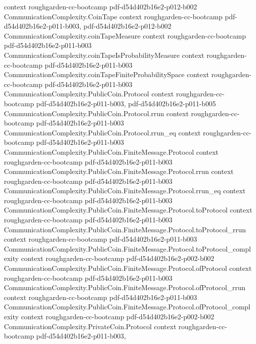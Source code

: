 \begin{theorem}
  {context}
  {roughgarden-cc-bootcamp}
  {pdf-d54d402b16e2-p012-b002}
\proofstep
  {CommunicationComplexity.CoinTape}
  {context}
  {roughgarden-cc-bootcamp}
  {pdf-d54d402b16e2-p011-b003,
    pdf-d54d402b16e2-p012-b002}
\proofstep
  {CommunicationComplexity.coinTapeMeasure}
  {context}
  {roughgarden-cc-bootcamp}
  {pdf-d54d402b16e2-p011-b003}
\proofstep
  {CommunicationComplexity.coinTapeIsProbabilityMeasure}
  {context}
  {roughgarden-cc-bootcamp}
  {pdf-d54d402b16e2-p011-b003}
\proofstep
  {CommunicationComplexity.coinTapeFiniteProbabilitySpace}
  {context}
  {roughgarden-cc-bootcamp}
  {pdf-d54d402b16e2-p011-b003}
\proofstep
  {CommunicationComplexity.PublicCoin.Protocol}
  {context}
  {roughgarden-cc-bootcamp}
  {pdf-d54d402b16e2-p011-b003,
    pdf-d54d402b16e2-p011-b005}
\proofstep
  {CommunicationComplexity.PublicCoin.Protocol.rrun}
  {context}
  {roughgarden-cc-bootcamp}
  {pdf-d54d402b16e2-p011-b003}
\proofstep
  {CommunicationComplexity.PublicCoin.Protocol.rrun_eq}
  {context}
  {roughgarden-cc-bootcamp}
  {pdf-d54d402b16e2-p011-b003}
\proofstep
  {CommunicationComplexity.PublicCoin.FiniteMessage.Protocol}
  {context}
  {roughgarden-cc-bootcamp}
  {pdf-d54d402b16e2-p011-b003}
\proofstep
  {CommunicationComplexity.PublicCoin.FiniteMessage.Protocol.rrun}
  {context}
  {roughgarden-cc-bootcamp}
  {pdf-d54d402b16e2-p011-b003}
\proofstep
  {CommunicationComplexity.PublicCoin.FiniteMessage.Protocol.rrun_eq}
  {context}
  {roughgarden-cc-bootcamp}
  {pdf-d54d402b16e2-p011-b003}
\proofstep
  {CommunicationComplexity.PublicCoin.FiniteMessage.Protocol.toProtocol}
  {context}
  {roughgarden-cc-bootcamp}
  {pdf-d54d402b16e2-p011-b003}
\proofstep
  {CommunicationComplexity.PublicCoin.FiniteMessage.Protocol.toProtocol_rrun}
  {context}
  {roughgarden-cc-bootcamp}
  {pdf-d54d402b16e2-p011-b003}
\proofstep
  {CommunicationComplexity.PublicCoin.FiniteMessage.Protocol.toProtocol_complexity}
  {context}
  {roughgarden-cc-bootcamp}
  {pdf-d54d402b16e2-p002-b002}
\proofstep
  {CommunicationComplexity.PublicCoin.FiniteMessage.Protocol.ofProtocol}
  {context}
  {roughgarden-cc-bootcamp}
  {pdf-d54d402b16e2-p011-b003}
\proofstep
  {CommunicationComplexity.PublicCoin.FiniteMessage.Protocol.ofProtocol_rrun}
  {context}
  {roughgarden-cc-bootcamp}
  {pdf-d54d402b16e2-p011-b003}
\proofstep
  {CommunicationComplexity.PublicCoin.FiniteMessage.Protocol.ofProtocol_complexity}
  {context}
  {roughgarden-cc-bootcamp}
  {pdf-d54d402b16e2-p002-b002}
\proofstep
  {CommunicationComplexity.PrivateCoin.Protocol}
  {context}
  {roughgarden-cc-bootcamp}
  {pdf-d54d402b16e2-p011-b003,
}
\end{theorem}
